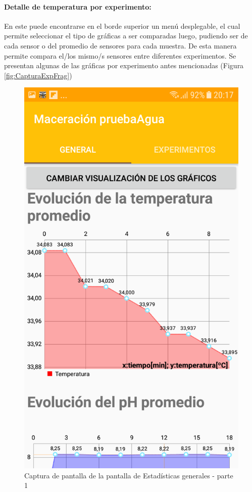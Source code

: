             \paragraph{Detalle de temperatura por experimento:} En este puede encontrarse en el borde superior un menú desplegable, el cual permite seleccionar el tipo de gráficas a ser comparadas luego, pudiendo ser de cada sensor o del promedio de sensores para cada muestra. De esta manera permite compara el/los mismo/s sensores entre diferentes experimentos. Se presentan algunas de las gráficas por experimento antes mencionadas (Figura \ref{fig:CapturaExpFrag})
            
            \begin{figure}[h]
                \centering
                \includegraphics[scale=0.2]{software/ScreenCapture/GeneralStatistics.jpg}
                \caption{Captura de pantalla de la pantalla de Estadísticas generales - parte 1}
                \label{fig:CapturaGeneralFrag-P1}
            \end{figure}
            
